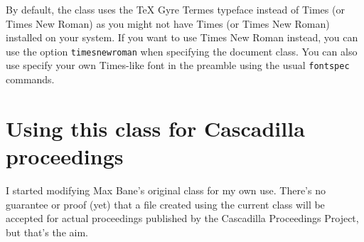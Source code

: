 \documentclass[expex]{cascadilla-xelatex-biblatex}
\begin{document}
By default, the class uses the TeX Gyre Termes typeface instead of Times (or
Times New Roman) as you might not have Times (or Times New Roman) installed on
your system. If you want to use Times New Roman instead, you can use the option
\texttt{timesnewroman} when specifying the document class. You can also use
specify your own Times-like font in the preamble using the usual
\texttt{fontspec} commands.

\section{Using this class for Cascadilla proceedings}

I started modifying Max Bane's original class for my own use. There's no
guarantee or proof (yet) that a file created using the current class will be
accepted for actual proceedings published by the Cascadilla Proceedings
Project, but that's the aim.

\printbibliography
\end{document}
